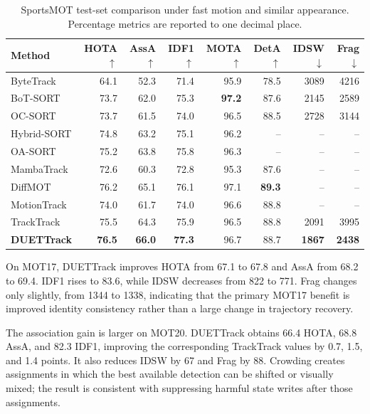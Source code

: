 \documentclass[a4paper,fleqn]{cas-sc}
\begin{document}
\begin{table}[pos=!ht]
\centering
\caption{SportsMOT test-set comparison under fast motion and similar appearance. Percentage metrics are reported to one decimal place.}
\label{tab:sportsmot}
{\footnotesize
\begin{tabular*}{\textwidth}{@{\extracolsep{\fill}}lrrrrrrr@{}}
\toprule
Method & HOTA$\uparrow$ & AssA$\uparrow$ & IDF1$\uparrow$ & MOTA$\uparrow$ & DetA$\uparrow$ & IDSW$\downarrow$ & Frag$\downarrow$ \\
\midrule
ByteTrack \cite{zhang2022bytetrack} & 64.1 & 52.3 & 71.4 & 95.9 & 78.5 & 3089 & 4216 \\
BoT-SORT \cite{aharon2022bot} & 73.7 & 62.0 & 75.3 & \textbf{97.2} & 87.6 & 2145 & 2589 \\
OC-SORT \cite{cao2023observation} & 73.7 & 61.5 & 74.0 & 96.5 & 88.5 & 2728 & 3144 \\
Hybrid-SORT \cite{yang2024hybrid} & 74.8 & 63.2 & 75.1 & 96.2 & -- & -- & -- \\
OA-SORT \cite{li2026occlusion} & 75.2 & 63.8 & 75.8 & 96.3 & -- & -- & -- \\
MambaTrack \cite{xiao2024mambatrack} & 72.6 & 60.3 & 72.8 & 95.3 & 87.6 & -- & -- \\
DiffMOT \cite{lv2024diffmot} & 76.2 & 65.1 & 76.1 & 97.1 & \textbf{89.3} & -- & -- \\
MotionTrack \cite{xiao2024motiontrack} & 74.0 & 61.7 & 74.0 & 96.6 & 88.8 & -- & -- \\
TrackTrack \cite{shim2025focusing} & 75.5 & 64.3 & 75.9 & 96.5 & 88.8 & 2091 & 3995 \\
\midrule
\textbf{DUETTrack} & \textbf{76.5} & \textbf{66.0} & \textbf{77.3} & 96.7 & 88.7 & \textbf{1867} & \textbf{2438} \\
\bottomrule
\end{tabular*}}
\end{table}

On MOT17, DUETTrack improves HOTA from 67.1 to 67.8 and AssA from 68.2 to 69.4. IDF1 rises to 83.6, while IDSW decreases from 822 to 771. Frag changes only slightly, from 1344 to 1338, indicating that the primary MOT17 benefit is improved identity consistency rather than a large change in trajectory recovery.

The association gain is larger on MOT20. DUETTrack obtains 66.4 HOTA, 68.8 AssA, and 82.3 IDF1, improving the corresponding TrackTrack values by 0.7, 1.5, and 1.4 points. It also reduces IDSW by 67 and Frag by 88. Crowding creates assignments in which the best available detection can be shifted or visually mixed; the result is consistent with suppressing harmful state writes after those assignments.
\end{document}
